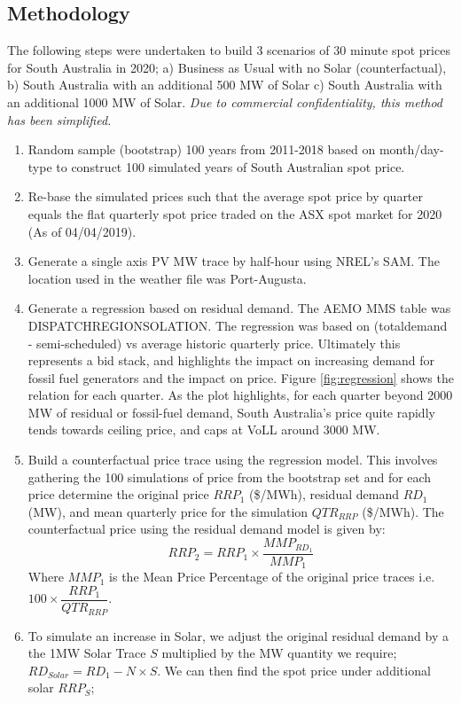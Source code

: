 \subsection{ Methodology }
The following steps were undertaken to build 3 scenarios of 30 minute spot prices for South Australia in 2020; a) Business as Usual with no Solar (counterfactual), b) South Australia with an additional 500 MW of Solar c) South Australia with an additional 1000 MW of Solar.
\newline
\textit{Due to commercial confidentiality, this method has been simplified.}
\begin{enumerate}
    \item Random sample (bootstrap) 100 years from 2011-2018 based on month/day-type to construct 100 simulated years of South Australian spot price. 
    \item Re-base the simulated prices such that the average spot price by quarter equals the flat quarterly spot price traded on the ASX spot market for 2020 (As of 04/04/2019).
    \item Generate a single axis PV MW trace by half-hour using NREL's SAM. The location used in the weather file was Port-Augusta.
    \item Generate a regression based on residual demand. The AEMO MMS table was DISPATCHREGIONSOLATION. The regression was based on (totaldemand - semi-scheduled) vs average historic quarterly price. Ultimately this represents a bid stack, and highlights the impact on increasing demand for fossil fuel generators and the impact on price.  Figure \ref{fig:regression} shows the relation for each quarter. As the plot highlights, for each quarter beyond 2000 MW of residual or fossil-fuel demand, South Australia's price quite rapidly tends towards ceiling price, and caps at VoLL around 3000 MW.
    \item Build a counterfactual price trace using the regression model. This involves gathering the 100 simulations of price from the bootstrap set and for each price determine the original price $RRP_1$ (\$/MWh), residual demand $RD_{1}$ (MW), and mean quarterly price for the simulation $QTR_{RRP}$ (\$/MWh).
    The counterfactual price using the residual demand model is given by: 
    \begin{equation}
        RRP_2 = RRP_1 \times \dfrac{MMP_{RD_1}}{MMP_1}
    \end{equation}
    Where $MMP_1$ is the Mean Price Percentage of the original price traces i.e. $100 \times \dfrac{RRP_1}{QTR_{RRP}}$.
    \item To simulate an increase in Solar, we adjust the original residual demand by a the 1MW Solar Trace $S$ multiplied by the MW quantity we require; $RD_{Solar} = RD_1 - N \times S $. We can then find the spot price under additional solar $RRP_S$; 

\end{enumerate}
